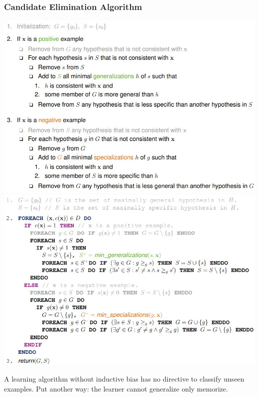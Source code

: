 \documentclass[11pt,a4paper]{article}
\begin{document}
\begin{flushleft}
\subsubsection{Candidate Elimination Algorithm}
\includegraphics[width=\textwidth]{Candidate1}
\includegraphics[width=\textwidth]{Candidate2}

A learning algorithm without inductive bias has no directive to classify unseen
examples. Put another way: the learner cannot generalize only memorize.


\end{flushleft}
\end{document}
